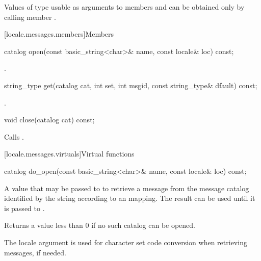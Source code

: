 \pnum
Values of type
usable as arguments to members
and
can be obtained only by calling member
.

[locale.messages.members]{Members}

%
\begin{itemdecl}
catalog open(const basic_string<char>& name, const locale& loc) const;
\end{itemdecl}

\begin{itemdescr}
\pnum
\returns
{}.
\end{itemdescr}

%
\begin{itemdecl}
string_type get(catalog cat, int set, int msgid, const string_type& dfault) const;
\end{itemdecl}

\begin{itemdescr}
\pnum
\returns
{}.
\end{itemdescr}

%
\begin{itemdecl}
void close(catalog cat) const;
\end{itemdecl}

\begin{itemdescr}
\pnum
\effects
Calls
.
\end{itemdescr}

[locale.messages.virtuals]{Virtual functions}

%
\begin{itemdecl}
catalog do_open(const basic_string<char>& name, const locale& loc) const;
\end{itemdecl}

\begin{itemdescr}
\pnum
\returns
A value that may be passed to
to retrieve a message from the message catalog identified by the string
 according to an  mapping.
The result can be used until it is passed to
.

\pnum
Returns a value less than 0 if no such catalog can be opened.

\pnum
\remarks
The locale argument 
is used for character set code conversion when retrieving
messages, if needed.
\end{itemdescr}

